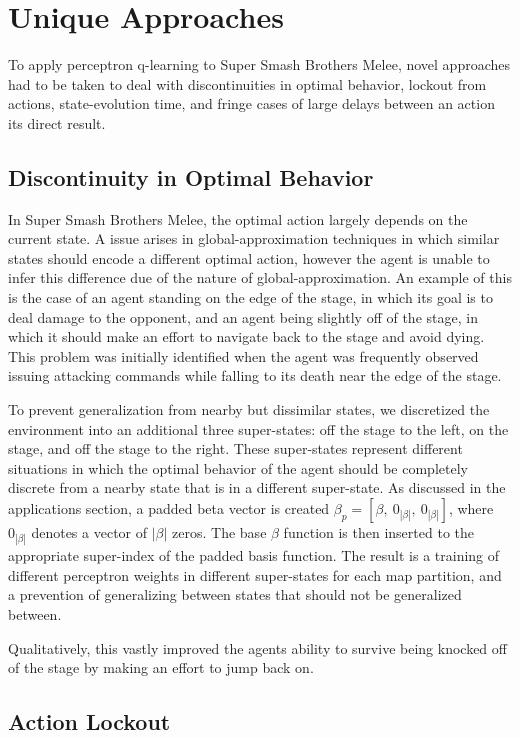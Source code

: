 \section{Unique Approaches}

To apply perceptron q-learning to Super Smash Brothers Melee, novel approaches had to be taken to deal with discontinuities in optimal behavior, lockout from actions, state-evolution time, and fringe cases of large delays between an action its direct result.

\subsection{Discontinuity in Optimal Behavior}
In Super Smash Brothers Melee, the optimal action largely depends on the current state. A issue arises in global-approximation techniques in which similar states should encode a different optimal action, however the agent is unable to infer this difference due of the nature of global-approximation. An example of this is the case of an agent standing on the edge of the stage, in which its goal is to deal damage to the opponent, and an agent being slightly off of the stage, in which it should make an effort to navigate back to the stage and avoid dying. This problem was initially identified when the agent was frequently observed issuing attacking commands while falling to its death near the edge of the stage. 

To prevent generalization from nearby but dissimilar states, we discretized the environment into an additional three super-states: off the stage to the left, on the stage, and off the stage to the right. These super-states represent different situations in which the optimal behavior of the agent should be completely discrete from a nearby state that is in a different super-state. As discussed in the applications section, a padded beta vector is created $\beta_{p} = [\beta,~0_{|\beta|},~0_{|\beta|}]$, where $0_{|\beta|}$ denotes a vector of $|\beta|$ zeros. The base $\beta$ function is then inserted to the appropriate super-index of the padded basis function. The result is a training of different perceptron weights in different super-states for each map partition, and a prevention of generalizing between states that should not be generalized between. 

Qualitatively, this vastly improved the agents ability to survive being knocked off of the stage by making an effort to jump back on. 

\subsection{Action Lockout}

